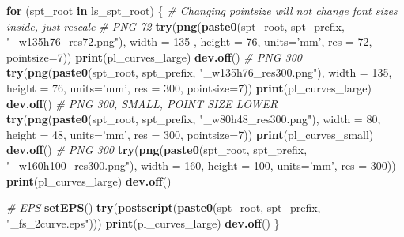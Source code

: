 \documentclass[
]{book}
\newenvironment{Shaded}{\begin{snugshade}}{\end{snugshade}}
\newcommand{\CommentTok}[1]{\textcolor[rgb]{0.56,0.35,0.01}{\textit{#1}}}
\newcommand{\ControlFlowTok}[1]{\textcolor[rgb]{0.13,0.29,0.53}{\textbf{#1}}}
\newcommand{\DataTypeTok}[1]{\textcolor[rgb]{0.13,0.29,0.53}{#1}}
\newcommand{\DecValTok}[1]{\textcolor[rgb]{0.00,0.00,0.81}{#1}}
\newcommand{\KeywordTok}[1]{\textcolor[rgb]{0.13,0.29,0.53}{\textbf{#1}}}
\newcommand{\NormalTok}[1]{#1}
\newcommand{\StringTok}[1]{\textcolor[rgb]{0.31,0.60,0.02}{#1}}
\begin{document}
\begin{Shaded}
\begin{Highlighting}[]
\ControlFlowTok{for}\NormalTok{ (spt_root }\ControlFlowTok{in}\NormalTok{ ls_spt_root) \{}
  \CommentTok{# Changing pointsize will not change font sizes inside, just rescale}
  \CommentTok{# PNG 72}
  \KeywordTok{try}\NormalTok{(}\KeywordTok{png}\NormalTok{(}\KeywordTok{paste0}\NormalTok{(spt_root, spt_prefix, }\StringTok{"_w135h76_res72.png"}\NormalTok{),}
      \DataTypeTok{width =} \DecValTok{135}\NormalTok{ , }\DataTypeTok{height =} \DecValTok{76}\NormalTok{, }\DataTypeTok{units=}\StringTok{'mm'}\NormalTok{, }\DataTypeTok{res =} \DecValTok{72}\NormalTok{, }\DataTypeTok{pointsize=}\DecValTok{7}\NormalTok{))}
  \KeywordTok{print}\NormalTok{(pl_curves_large)}
  \KeywordTok{dev.off}\NormalTok{()}
  \CommentTok{# PNG 300}
  \KeywordTok{try}\NormalTok{(}\KeywordTok{png}\NormalTok{(}\KeywordTok{paste0}\NormalTok{(spt_root, spt_prefix, }\StringTok{"_w135h76_res300.png"}\NormalTok{),}
      \DataTypeTok{width =} \DecValTok{135}\NormalTok{, }\DataTypeTok{height =} \DecValTok{76}\NormalTok{, }\DataTypeTok{units=}\StringTok{'mm'}\NormalTok{, }\DataTypeTok{res =} \DecValTok{300}\NormalTok{, }\DataTypeTok{pointsize=}\DecValTok{7}\NormalTok{))}
  \KeywordTok{print}\NormalTok{(pl_curves_large)}
  \KeywordTok{dev.off}\NormalTok{()}
  \CommentTok{# PNG 300, SMALL, POINT SIZE LOWER}
  \KeywordTok{try}\NormalTok{(}\KeywordTok{png}\NormalTok{(}\KeywordTok{paste0}\NormalTok{(spt_root, spt_prefix, }\StringTok{"_w80h48_res300.png"}\NormalTok{),}
      \DataTypeTok{width =} \DecValTok{80}\NormalTok{, }\DataTypeTok{height =} \DecValTok{48}\NormalTok{, }\DataTypeTok{units=}\StringTok{'mm'}\NormalTok{, }\DataTypeTok{res =} \DecValTok{300}\NormalTok{, }\DataTypeTok{pointsize=}\DecValTok{7}\NormalTok{))}
  \KeywordTok{print}\NormalTok{(pl_curves_small)}
  \KeywordTok{dev.off}\NormalTok{()}
  \CommentTok{# PNG 300}
  \KeywordTok{try}\NormalTok{(}\KeywordTok{png}\NormalTok{(}\KeywordTok{paste0}\NormalTok{(spt_root, spt_prefix, }\StringTok{"_w160h100_res300.png"}\NormalTok{),}
      \DataTypeTok{width =} \DecValTok{160}\NormalTok{, }\DataTypeTok{height =} \DecValTok{100}\NormalTok{, }\DataTypeTok{units=}\StringTok{'mm'}\NormalTok{, }\DataTypeTok{res =} \DecValTok{300}\NormalTok{))}
  \KeywordTok{print}\NormalTok{(pl_curves_large)}
  \KeywordTok{dev.off}\NormalTok{()}

  \CommentTok{# EPS}
  \KeywordTok{setEPS}\NormalTok{()}
  \KeywordTok{try}\NormalTok{(}\KeywordTok{postscript}\NormalTok{(}\KeywordTok{paste0}\NormalTok{(spt_root, spt_prefix, }\StringTok{"_fs_2curve.eps"}\NormalTok{)))}
  \KeywordTok{print}\NormalTok{(pl_curves_large)}
  \KeywordTok{dev.off}\NormalTok{()}
\NormalTok{\}}
\end{Highlighting}
\end{Shaded}
\end{document}
